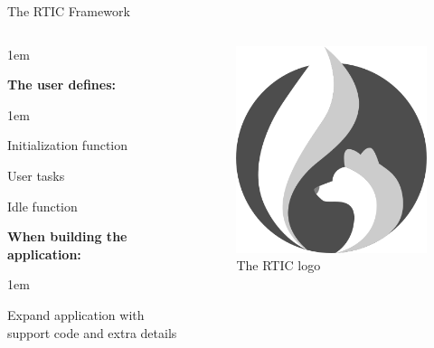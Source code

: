 \begin{frame}{The RTIC Framework}
    \begin{columns}
        \begin{itemize-size}{1em}
            \item \textbf{The user defines:}
            \begin{itemize-size}{1em}
                \item Initialization function
                \item User tasks
                \item Idle function
            \end{itemize-size}
            \item \textbf{When building the application:}
            \begin{itemize-size}{1em}
                \item Expand application with support code
                and extra details
            \end{itemize-size}
        \end{itemize-size}

        \begin{figure}
            \centering
            \includegraphics[scale=0.35]{pictures/RTIC.png}
            \caption{The RTIC logo}
        \end{figure}
    \end{columns}
\end{frame}

